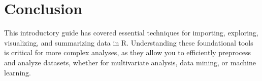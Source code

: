 \section{Conclusion}
This introductory guide has covered essential techniques for importing, exploring, visualizing, and summarizing data in R. Understanding these foundational tools is critical for more complex analyses, as they allow you to efficiently preprocess and analyze datasets, whether for multivariate analysis, data mining, or machine learning.

